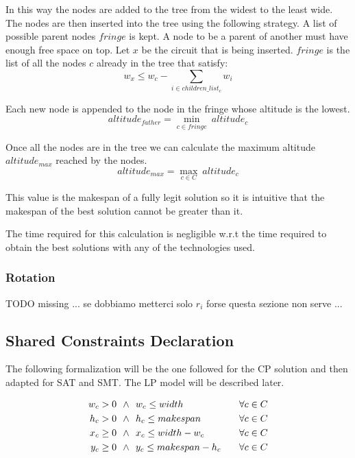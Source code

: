         In this way the nodes are added to the tree from the widest to the least wide.
        The nodes are then inserted into the tree using the following strategy. A list of possible parent nodes $fringe$ is kept. 
        A node to be a parent of another must have enough free space on top. Let $x$ be the circuit that 
        is being inserted. $fringe$ is the list of all the nodes $c$ already in the tree that satisfy: 
        \begin{equation}
            w_x \leq w_c - \sum_{i \in children\_list_c} w_i
        \end{equation}
        
        Each new node is appended to the node in the fringe whose altitude is the lowest.
        \begin{equation}
            altitude_{father} = \min_{c \in fringe}\ {altitude_c} 
        \end{equation}

        Once all the nodes are in the tree we can calculate the maximum altitude $altitude_{max}$ reached by the nodes.
        \begin{equation}
            altitude_{max} = \max_{c \in C}\  altitude_c
        \end{equation}

        This value is the makespan of a fully legit solution so it is intuitive that the makespan of the best solution cannot
        be greater than it. 
        
        The time required for this calculation is negligible w.r.t the time required to obtain the best solutions with any 
        of the technologies used.

    \subsubsection{Rotation}
        \colorbox{BurntOrange}{TODO missing ... se dobbiamo metterci solo $r_i$ forse questa sezione non serve ...}



\subsection{Shared Constraints Declaration} \label{sec:shared_constraints}
    The following formalization will be the one followed for the CP solution and then adapted for SAT and SMT. 
    The LP model will be described later.

    \begin{align*}
           w_c > 0\ \ \land\ &\ w_c \leq width\    & \hspace{0.2cm} \forall c \in C \\
           h_c > 0\ \ \land\ &\ h_c \leq makespan\ & \hspace{0.2cm} \forall c \in C \\
        x_c \geq 0\ \ \land\ &\ x_c \leq width - w_c\    & \hspace{0.2cm} \forall c \in C \\
        y_c \geq 0\ \ \land\ &\ y_c \leq makespan - h_c\ & \hspace{0.2cm} \forall c \in C
    \end{align*}

